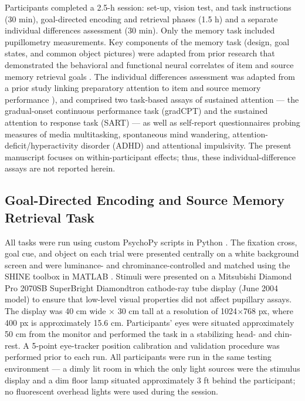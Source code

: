 Participants completed a 2.5-h session: set-up, vision test, and task instructions (30 min), goal-directed encoding and retrieval phases (1.5 h) and a separate individual differences assessment (30 min). Only the memory task included pupillometry measurements. Key components of the memory task (design, goal states, and common object pictures) were adapted from prior research that demonstrated the behavioral and functional neural correlates of item and source memory retrieval goals \parencite{dobbins2005domain}. The individual differences assessment was adapted from a prior study linking preparatory attention to item and source memory performance \parencite{madore2020memory}), and comprised two task-based assays of sustained attention — the gradual-onset continuous performance task (gradCPT) \parencite{esterman2013zone} and the sustained attention to response task (SART) \parencite{debettencourt2019realtime} — as well as self-report questionnaires probing measures of media multitasking, spontaneous mind wandering, attention-deficit/hyperactivity disorder (ADHD) and attentional impulsivity. The present manuscript focuses on within-participant effects; thus, these individual-difference assays are not reported herein.

\subsection{Goal-Directed Encoding and Source Memory Retrieval Task}

All tasks were run using custom PsychoPy scripts in Python \parencite{peirce2007psychopy}. The fixation cross, goal cue, and object on each trial were presented centrally on a white background screen and were luminance- and chrominance-controlled and matched using the SHINE toolbox in MATLAB \parencite{willenbockel2010controlling,dalben2023shine}. Stimuli were presented on a Mitsubishi Diamond Pro 2070SB SuperBright Diamondtron cathode-ray tube display (June 2004 model) to ensure that low-level visual properties did not affect pupillary assays. The display was 40 cm wide $\times$ 30 cm tall at a resolution of 1024$\times$768 px, where 400 px is approximately 15.6 cm. Participants' eyes were situated approximately 50 cm from the monitor and performed the task in a stabilizing head- and chin-rest. A 5-point eye-tracker position calibration and validation procedure was performed prior to each run. All participants were run in the same testing environment –– a dimly lit room in which the only light sources were the stimulus display and a dim floor lamp situated approximately 3 ft behind the participant; no fluorescent overhead lights were used during the session.

